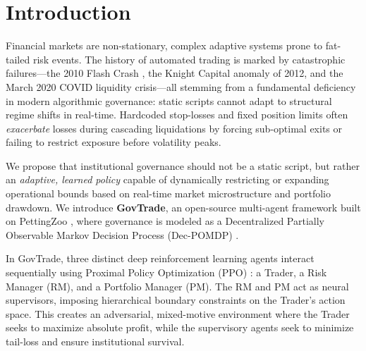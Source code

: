 \documentclass[11pt]{article}
\begin{document}
\section{Introduction}
\label{sec:intro}

Financial markets are non-stationary, complex adaptive systems prone to fat-tailed risk events. The history of automated trading is marked by catastrophic failures---the 2010 Flash Crash \cite{kirilenko2017flash}, the Knight Capital anomaly of 2012, and the March 2020 COVID liquidity crisis---all stemming from a fundamental deficiency in modern algorithmic governance: static scripts cannot adapt to structural regime shifts in real-time. Hardcoded stop-losses and fixed position limits often \emph{exacerbate} losses during cascading liquidations by forcing sub-optimal exits or failing to restrict exposure before volatility peaks.

We propose that institutional governance should not be a static script, but rather an \emph{adaptive, learned policy} capable of dynamically restricting or expanding operational bounds based on real-time market microstructure and portfolio drawdown. We introduce \textbf{GovTrade}, an open-source multi-agent framework built on PettingZoo \cite{terry2021pettingzoo}, where governance is modeled as a Decentralized Partially Observable Markov Decision Process (Dec-POMDP) \cite{oliehoek2016concise}.

In GovTrade, three distinct deep reinforcement learning agents interact sequentially using Proximal Policy Optimization (PPO) \cite{schulman2017proximal}: a Trader, a Risk Manager (RM), and a Portfolio Manager (PM). The RM and PM act as neural supervisors, imposing hierarchical boundary constraints on the Trader's action space. This creates an adversarial, mixed-motive environment where the Trader seeks to maximize absolute profit, while the supervisory agents seek to minimize tail-loss and ensure institutional survival.
\end{document}
